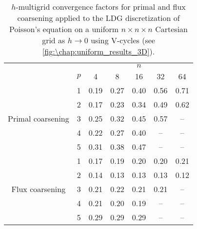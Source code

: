 \begin{table}[htb]
\caption{$h$-multigrid convergence factors for primal and flux coarsening applied to the LDG discretization of Poisson's equation on a uniform $n \times n \times n$ Cartesian grid as ${h\to 0}$ using V-cycles (see \cref{fig:\chap:uniform_results_3D}).\vspace{-1.8em}}
\label{tab:3D_uniform_vcycles}
\centering
\small
\begin{tabular}{@{}cl@{\qquad}ccccc@{}}
&&&&&& \\ \midrule
&& \multicolumn{5}{c}{$n$} \\
& $p$ & 4 & 8 & 16 & 32 & 64 \\ \cmidrule{1-7}
\multirow{5}{*}{Primal coarsening}
& 1 & 0.19 & 0.27 & 0.40 & 0.56 & 0.71 \\ 
& 2 & 0.17 & 0.23 & 0.34 & 0.49 & 0.62 \\ 
& 3 & 0.25 & 0.32 & 0.45 & 0.57 &  --  \\ 
& 4 & 0.22 & 0.27 & 0.40 &  --  &  --  \\ 
& 5 & 0.31 & 0.38 & 0.47 &  --  &  --  \\ \cmidrule{1-7}
\multirow{5}{*}{Flux coarsening}
& 1 & 0.17 & 0.19 & 0.20 & 0.20 & 0.21 \\ 
& 2 & 0.14 & 0.13 & 0.13 & 0.13 & 0.12 \\ 
& 3 & 0.21 & 0.22 & 0.21 & 0.21 &  --  \\ 
& 4 & 0.21 & 0.20 & 0.19 &  --  &  --  \\ 
& 5 & 0.29 & 0.29 & 0.29 &  --  &  --  \\ \midrule
\end{tabular}
\end{table}

